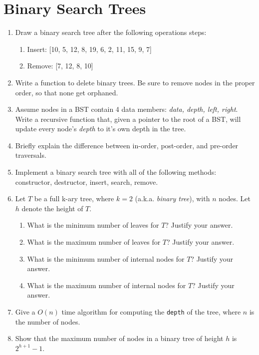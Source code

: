 \documentclass[11pt]{article}
\begin{document}
\section{Binary Search Trees}
\begin{enumerate}
    \item Draw a binary search tree after the following operations steps:
    \begin{enumerate}
        \item Insert: [10, 5, 12, 8, 19, 6, 2, 11, 15, 9, 7]
        \item Remove: [7, 12, 8, 10]
    \end{enumerate}
    
    \item Write a function to delete binary trees. Be sure to remove nodes in the proper order, so that none get orphaned.

    \item Assume nodes in a BST contain 4 data members: {\it data, depth, left, right}.  Write a recursive function that, given a pointer to the root of a BST, will update every node's {\it depth} to it's own depth in the tree. 

    \item Briefly explain the difference between in-order, post-order, and pre-order traversals.

    \item Implement a binary search tree with all of the following methods: constructor, destructor, insert, search, remove.

    \item Let $T$ be a full k-ary tree, where $k=2$ (a.k.a. {\it binary tree}), with $n$ nodes.  Let $h$ denote the height of $T$.
    \begin{enumerate}
        \item What is the minimum number of leaves for $T$?  Justify your answer.
        \item What is the maximum number of leaves for $T$?  Justify your answer.
        \item What is the minimum number of internal nodes for $T$?  Justify your answer.
        \item What is the maximum number of internal nodes for $T$?  Justify your answer.
    \end{enumerate}

    \item Give a $O(n)$ time algorithm for computing the \verb|depth| of the tree, where $n$ is the number of nodes.

    \item Show that the maximum number of nodes in a binary tree of height $h$ is $2^{h+1}-1$.
\end{enumerate}

\label{r:lastpage}
\end{document}
